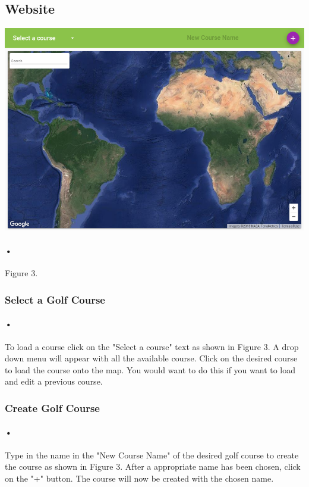 \documentclass{article}
\begin{document}
    \subsection{Website}
    \includegraphics[scale=0.4]{map}
    \paragraph{•}
    Figure 3.
    
	\subsubsection{Select a Golf Course}    
	\paragraph{•}    
	To load a course click on the "Select a course" text as shown in Figure 3. A drop down menu will appear with all the available course. Click on the desired course to load the course onto the map. You would want to do this if you want to load and edit a previous course.
    
    
    \subsubsection{Create Golf Course}
    \paragraph{•}
    Type in the name in the "New Course Name" of the desired golf course to create the course as shown in Figure 3. After a appropriate name has been chosen, click on the "+" button. The course will now be created with the chosen name.
	
\end{document}
